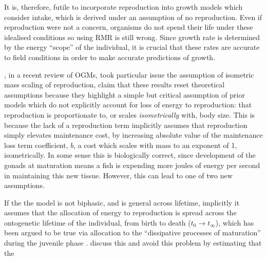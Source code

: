 \documentclass[a4paper]{article} %
\begin{document}
It is, therefore, futile to incorporate reproduction into growth models which consider intake, which is derived under an assumption of no reproduction. Even if reproduction were not a concern, organisms do not spend their life under these idealised conditions so using RMR is still wrong. Since growth rate is determined by the energy ``scope'' of the individual, it is crucial that these rates are accurate to field conditions in order to make accurate predictions of growth.

\cite{Marshall2019b}, in a recent review of OGMs, took particular issue the assumption of isometric mass scaling of reproduction,  \cite{Marshall2019b} claim that these results reset theoretical assumptions because they highlight a simple but critical assumption of prior models which do not explicitly account for loss of energy to reproduction: that reproduction is proportionate to, or scales \textit{isometrically} with, body size. This is because the lack of a reproduction term implicitly assumes that reproduction simply elevates maintenance cost, by increasing absolute value of the maintenance loss term coefficient, $b$, a cost which scales with mass to an exponent of 1, isometrically. In some sense this is biologically correct, since development of the gonads at maturation means a fish is expending more joules of energy per second in maintaining this new tissue. However, this can lead to one of two new assumptions. 
        
    If the the model is not biphasic, and is general across lifetime, implicitly it assumes that the allocation of energy to reproduction is spread across the ontogenetic lifetime of the individual, from birth to death ($t_0 \rightarrow t_{\infty}$), which has been argued to be true via allocation to the ``dissipative processes of maturation'' during the juvenile phase \autocite{Kearney2019}. \cite{West2001} discuss this and avoid this problem by estimating that the 
        
\end{document}
